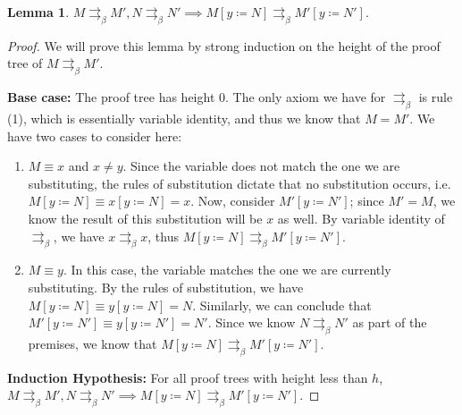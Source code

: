 \documentclass[a4paper,11pt]{article}
\theoremstyle{definition}
\theoremstyle{example}
\theoremstyle{lemma}
\newtheorem{lemma}{Lemma}
\newcommand{\subs}[3]{#1[#2\coloneqq#3]}
\newcommand{\pbr}{\rightrightarrows_{\beta}}
\begin{document}
\begin{lemma}
$M \pbr M', N \pbr N' \implies \subs{M}{y}{N} \pbr \subs{M'}{y}{N'}$.
\end{lemma}
\begin{proof}
We will prove this lemma by strong induction on the height of the proof tree of $M \pbr M'$.

\textbf{Base case: }The proof tree has height $0$. The only axiom we have for $\pbr$ is rule (1), which is essentially variable identity, and thus we know that $M = M'$. We have two cases to consider here: 
\begin{enumerate}[topsep=2pt,itemsep=-0.5ex,partopsep=1ex,parsep=1ex]
    \item $M \equiv x$ and $x \neq y$. Since the variable does not match the one we are substituting, the rules of substitution dictate that no substitution occurs, i.e. $\subs{M}{y}{N} \equiv \subs{x}{y}{N} = x$. Now, consider $\subs{M'}{y}{N'}$; since $M' = M$, we know the result of this substitution will be $x$ as well. By variable identity of $\pbr$, we have $x \pbr x$, thus $\subs{M}{y}{N} \pbr \subs{M'}{y}{N'}$.
    \item $M \equiv y$. In this case, the variable matches the one we are currently substituting. By the rules of substitution, we have $\subs{M}{y}{N} \equiv \subs{y}{y}{N} = N$. Similarly, we can conclude that $\subs{M'}{y}{N'} \equiv \subs{y}{y}{N'} = N'$. Since we know $N \pbr N'$ as part of the premises, we know that $\subs{M}{y}{N} \pbr \subs{M'}{y}{N'}$.
\end{enumerate} 

\textbf{Induction Hypothesis: }For all proof trees with height less than $h$, $M \pbr M', N \pbr N' \implies \subs{M}{y}{N} \pbr \subs{M'}{y}{N'}$.


\end{proof}
\end{document}
